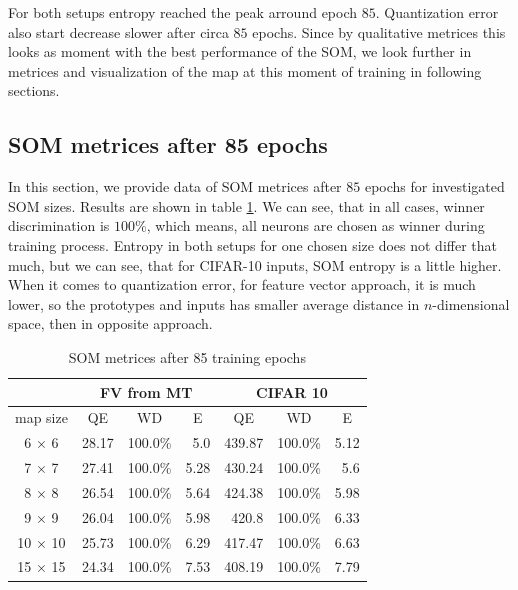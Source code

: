 For both setups entropy reached the peak arround epoch $85$. Quantization error also start decrease slower after circa $85$ epochs. Since by qualitative metrices this looks as moment with the best performance of the SOM, we look further in metrices and  visualization of the map at this moment of training in following sections.

\subsection{SOM metrices after 85 epochs}

In this section, we provide data of SOM metrices after $85$ epochs for investigated SOM sizes. Results are shown in table \ref{tab:som-metrices-85ep}. We can see, that in all cases, winner discrimination is $100\%$, which means, all neurons are chosen as winner during training process. Entropy in both setups for one chosen size does not differ that much, but we can see, that for CIFAR-10 inputs, SOM entropy is a little higher. When it comes to quantization error, for feature vector approach, it is much lower, so the prototypes and inputs has smaller average distance in $n$-dimensional space, then in opposite approach. 

\begin{table}[h!]
\centering
\begin{tabular}{|c|rrr|rrr|}
\hline
\multicolumn{1}{|l|}{} & \multicolumn{3}{c|}{FV from MT}                                              & \multicolumn{3}{c|}{CIFAR 10}                                            \\ \hline
\multicolumn{1}{|c|}{map size} & \multicolumn{1}{c|}{QE} & \multicolumn{1}{c|}{WD} & \multicolumn{1}{c|}{E} & \multicolumn{1}{c|}{QE} & \multicolumn{1}{c|}{WD} & \multicolumn{1}{c|}{E} \\ \hline
6 $\times$ 6& \multicolumn{1}{r|}{28.17}   & \multicolumn{1}{r|}{100.0\%}   &  5.0 & \multicolumn{1}{r|}{439.87} & \multicolumn{1}{r|}{100.0\%} &  5.12 \\ \hline
7 $\times$ 7& \multicolumn{1}{r|}{27.41}   & \multicolumn{1}{r|}{100.0\%}   &  5.28 & \multicolumn{1}{r|}{430.24} & \multicolumn{1}{r|}{100.0\%} &  5.6 \\ \hline
8 $\times$ 8& \multicolumn{1}{r|}{26.54}   & \multicolumn{1}{r|}{100.0\%}   &  5.64 & \multicolumn{1}{r|}{424.38} & \multicolumn{1}{r|}{100.0\%} &  5.98 \\ \hline
9 $\times$ 9& \multicolumn{1}{r|}{26.04}   & \multicolumn{1}{r|}{100.0\%}   &  5.98 & \multicolumn{1}{r|}{420.8} & \multicolumn{1}{r|}{100.0\%} &  6.33 \\ \hline
10 $\times$ 10& \multicolumn{1}{r|}{25.73}   & \multicolumn{1}{r|}{100.0\%}   &  6.29 & \multicolumn{1}{r|}{417.47} & \multicolumn{1}{r|}{100.0\%} &  6.63 \\ \hline
15 $\times$ 15& \multicolumn{1}{r|}{24.34}   & \multicolumn{1}{r|}{100.0\%}   &  7.53 & \multicolumn{1}{r|}{408.19} & \multicolumn{1}{r|}{100.0\%} &  7.79 \\ \hline

\end{tabular}
\caption{SOM metrices after 85 training epochs}
\label{tab:som-metrices-85ep}
\end{table}

